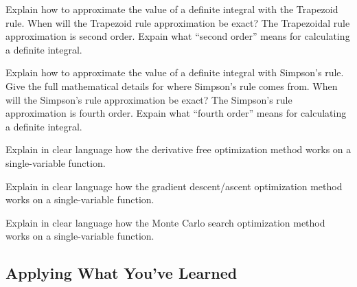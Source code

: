 \begin{problem}
    Explain how to approximate the value of a definite integral with the Trapezoid rule.
    When will the Trapezoid rule approximation be exact?  The Trapezoidal rule
    approximation is second
    order.  Expain what ``second order'' means for calculating a definite integral. 
\end{problem}

\begin{problem}
    Explain how to approximate the value of a definite integral with Simpson's rule.  Give
    the full mathematical details for where Simpson's rule comes from.  When will the
    Simpson's rule approximation be exact?  The Simpson's rule approximation is fourth
    order.  Expain what ``fourth order'' means for calculating a definite integral. 
\end{problem}

\begin{problem}
    Explain in clear language how the derivative free optimization method works on a
    single-variable function.
\end{problem}

\begin{problem}
    Explain in clear language how the gradient descent/ascent optimization method works on a
    single-variable function.
\end{problem}

\begin{problem}
    Explain in clear language how the Monte Carlo search optimization method works on a
    single-variable function.
\end{problem}

\subsection{Applying What You've Learned}

